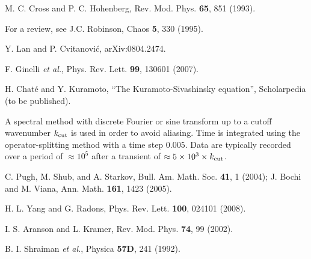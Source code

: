\documentclass[prl,twocolumn,twoside,showpacs,superscriptaddress]{revtex4}
\begin{document}
\begin{thebibliography}{99}

 M. C. Cross and P. C. Hohenberg, Rev. Mod. Phys. \textbf{65}, 851 (1993).

For a review, see J.C. Robinson, Chaos {\bf 5}, 330 (1995).


 Y. Lan and P. Cvitanovi\'c, arXiv:0804.2474.

 F. Ginelli \textit{et al.}, Phys. Rev. Lett. \textbf{99}, 130601 (2007).

 H. Chat\'e and Y. Kuramoto, ``The Kuramoto-Sivashinsky equation'', Scholarpedia (to be published).

A spectral method with discrete Fourier or sine transform
 up to a cutoff wavenumber $k_{\rm cut}$ is used in order to avoid aliasing.
Time is integrated using the operator-splitting method with a time step $0.005$.
Data are typically recorded over a period of $\approx 10^5$
 after a transient of $\approx 5 \times 10^3 \times k_{\rm cut}$.

 C. Pugh, M. Shub, and A. Starkov, Bull. Am. Math. Soc. \textbf{41}, 1 (2004);
 J. Bochi and M. Viana, Ann. Math. \textbf{161}, 1423 (2005).

 H. L. Yang and G. Radons, Phys. Rev. Lett. \textbf{100}, 024101 (2008).

 I. S. Aranson and L. Kramer, Rev. Mod. Phys. \textbf{74}, 99 (2002).

 B. I. Shraiman \textit{et al.}, Physica \textbf{57D}, 241 (1992).


\end{thebibliography}
\end{document}

